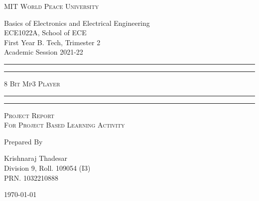 \documentclass[11pt]{article}
\begin{document}
	
	\begin{titlepage} 
		\centering 
		

		\Huge\textsc{
			MIT World Peace University
		}\\

		\vspace{1.00\baselineskip} %
		
		\LARGE{
			Basics of Electronics and Electrical Engineering\\
			ECE1022A, School of ECE\\
			First Year B. Tech, Trimester 2\\
			Academic Session 2021-22
		}
		
		\vfill %

		
		
		\rule{\textwidth}{1.6pt}\vspace*{-\baselineskip}\vspace*{2pt}
		\rule{\textwidth}{0.6pt}
		\vspace{0.75\baselineskip} %
		
		
		
		\Huge{\textsc{
				8 Bit Mp3 Player
			}} \\
		
		
		
		\vspace{0.5\baselineskip} %
		\rule{\textwidth}{0.6pt}\vspace*{-\baselineskip}\vspace*{2.8pt}
		\rule{\textwidth}{1.6pt}
		
		\vspace{1\baselineskip} %

			
		\LARGE\textsc{
			Project Report\\
			For Project Based Learning Activity
		} %
		\vfill
		
		
		Prepared By
		\vspace{0.5\baselineskip} %
		
		\Large{
			Krishnaraj Thadesar \\
			Division 9,
			Roll. 109054  (I3)\\
			PRN. 1032210888
		}
		
		
		\vspace{1\baselineskip} %
		\today

	\end{titlepage}
	
\end{document}
